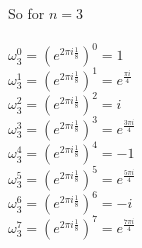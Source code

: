 \documentclass{article}
\begin{document}
\\ \\ \\
So for $n=3$\\ \\
\(\omega_3^0 = (e^{2\pi i \frac{1}{8}})^{0} = 1 \) \\
\(\omega_3^1 = (e^{2\pi i \frac{1}{8}})^{1} = e^{\frac{\pi  i}{4}} \) \\
\(\omega_3^2 = (e^{2\pi i \frac{1}{8}})^{2} = i \) \\
\(\omega_3^3 = (e^{2\pi i \frac{1}{8}})^{3} = e^{\frac{3 \pi i}{4}} \) \\
\(\omega_3^4 = (e^{2\pi i \frac{1}{8}})^{4} = -1 \) \\
\(\omega_3^5 = (e^{2\pi i \frac{1}{8}})^{5} = e^{\frac{5 \pi i}{4}} \) \\
\(\omega_3^6 = (e^{2\pi i \frac{1}{8}})^{6} = -i \) \\
\(\omega_3^7 = (e^{2\pi i \frac{1}{8}})^{7} = e^{\frac{7 \pi i}{4}} \) \\
\end{document}
